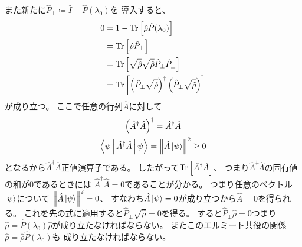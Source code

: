 \documentclass[a4paper, 10pt, uplatex]{jsarticle}
\begin{document}
\begin{problem}[label=pr:3]
	また新たに$\hat{P}_\perp \coloneqq \hat{I} - \hat{P}(\lambda_0)$を
	導入すると、
	\begin{align}
		0
		&= 1 - \operatorname*{Tr} \left[ \hat{\rho} \hat{P} (\lambda_0) \right] \\
		&= \operatorname*{Tr} \left[ \hat{\rho} \hat{P}_\perp \right] \\
		&= \operatorname*{Tr} \left[ \sqrt{\hat{\rho}} \sqrt{\hat{\rho}}
		\hat{P}_\perp \hat{P}_\perp \right] \\
		&= \operatorname*{Tr} \left[ \left( \hat{P}_\perp \sqrt{\hat{\rho}} \right)^\dagger
		\left( \hat{P}_\perp \sqrt{\hat{\rho}} \right) \right]
	\end{align}
	が成り立つ。
	ここで任意の行列$\hat{A}$に対して
	\begin{gather}
		\left( \hat{A}^\dagger \hat{A} \right)^\dagger
		= \hat{A}^\dagger \hat{A} \\
		\Braket{\psi | \hat{A}^\dagger \hat{A} | \psi}
		= \left\| \hat{A} \Ket{\psi} \right\|^2
		\geq 0
	\end{gather}
	となるから$\hat{A}^\dagger \hat{A}$正値演算子である。
	したがって$\operatorname*{Tr} \left[ \hat{A}^\dagger \hat{A} \right]$、
	つまり$\hat{A}^\ddagger \hat{A}$の固有値の和が0であるときには
	$\hat{A}^\dagger \hat{A} = 0$であることが分かる。
	つまり任意のベクトル$\Ket{\psi}$について
	$\left\| \hat{A} \Ket{\psi} \right\|^2 = 0$、
	すなわち$\hat{A} \Ket{\psi} = 0$が成り立つから$\hat{A} = 0$を得られる。
	これを先の式に適用すると$\hat{P}_\perp \sqrt{\hat{\rho}} = 0$を得る。
	すると$\hat{P}_\perp \hat{\rho} = 0$つまり
	$\hat{\rho} = \hat{P}(\lambda_0) \hat{\rho}$が成り立たなければならない。
	またこのエルミート共役の関係$\hat{\rho} = \hat{\rho} \hat{P}(\lambda_0)$も
	成り立たなければならない。
	

\end{problem}
\end{document}

